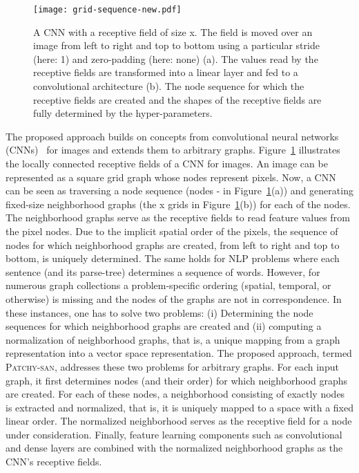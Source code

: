 \documentclass{article}
\newcommand{\patchysan}{{\textsc{Patchy-san}}\xspace}
\begin{document}
\begin{figure}
\centering
\texttt{[image: grid-sequence-new.pdf]}
\caption{\label{fig-grid} A CNN with a receptive field of size x. The field is moved over an image from left to right and top to bottom using a particular stride (here: 1) and zero-padding (here: none) (a). The values read by the receptive fields are transformed into a linear layer and fed to a convolutional architecture (b). The node sequence for which the receptive fields are created and the shapes of the receptive fields are fully determined by the hyper-parameters.}
\end{figure}

The proposed approach builds on concepts from convolutional neural networks (CNNs)~\cite{Kunihiko:1980,atlas:1987,lecun:1998,lecun:2015} for images and extends them to arbitrary graphs. 
Figure~\ref{fig-grid} illustrates the locally connected receptive fields of a CNN for images. An image can be represented as a square grid graph whose nodes represent pixels. Now, a CNN can be seen as traversing a node sequence (nodes - in Figure~\ref{fig-grid}(a)) and  generating fixed-size neighborhood graphs (the x grids in Figure~\ref{fig-grid}(b)) for each of the nodes. The neighborhood graphs serve as the receptive fields to read feature values from the pixel nodes. Due to the implicit spatial order of the pixels, the sequence of nodes for which neighborhood graphs are created, from left to right and top to bottom, is uniquely determined. The same holds for NLP problems where each sentence (and its parse-tree) determines a sequence of words. However, for numerous graph collections a problem-specific ordering (spatial, temporal, or otherwise) is missing and the nodes of the  graphs are not in correspondence. In these instances, one has to  solve two problems: (i) Determining the node sequences for which neighborhood graphs are created and (ii) computing a normalization of neighborhood graphs, that is, a unique mapping from a graph representation into a vector space representation. 
The proposed approach, termed \patchysan, addresses these two problems for arbitrary graphs. For each input graph, it first determines nodes (and their order) for which neighborhood graphs are created. For each of these nodes, a neighborhood consisting of exactly  nodes is extracted and normalized, that is, it is uniquely mapped to a space with a fixed linear order. The normalized neighborhood serves as the receptive field for a node under consideration. Finally, feature learning components such as convolutional and dense layers are combined with the normalized neighborhood graphs as the CNN's receptive fields.
\end{document}
